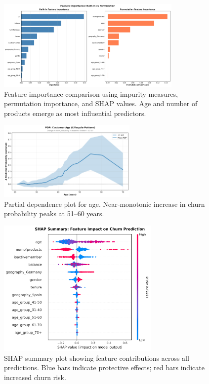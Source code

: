 \documentclass[12pt]{article}
\begin{document}
\begin{figure}[H]
\centering
\includegraphics[width=0.8\textwidth]{img/15_feature_importance_comparison.png}
\caption{Feature importance comparison using impurity measures, permutation importance, and SHAP values. Age and number of products emerge as most influential predictors.}
\label{fig:feature_importance}
\end{figure}

\begin{figure}[H]
\centering
\includegraphics[width=0.6\textwidth]{img/18_pdp_age.png}
\caption{Partial dependence plot for age. Near‑monotonic increase in churn probability peaks at 51–60 years.}
\label{fig:pdp_age}
\end{figure}


\begin{figure}[H]
\centering
\includegraphics[width=0.7\textwidth]{img/20_shap_summary.png}
\caption{SHAP summary plot showing feature contributions across all predictions. Blue bars indicate protective effects; red bars indicate increased churn risk.}
\label{fig:shap}
\end{figure}
\end{document}
